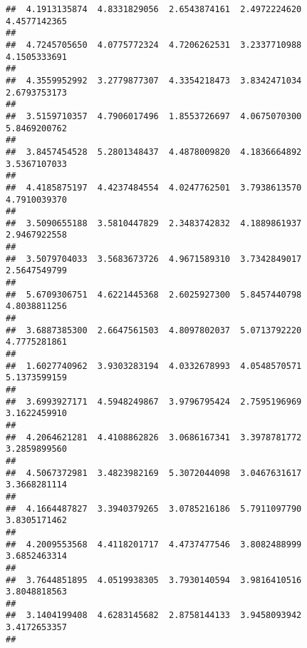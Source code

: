 \documentclass[]{article}
\begin{document}
\begin{verbatim}
##  4.1913135874  4.8331829056  2.6543874161  2.4972224620  4.4577142365 
##                                                                       
##  4.7245705650  4.0775772324  4.7206262531  3.2337710988  4.1505333691 
##                                                                       
##  4.3559952992  3.2779877307  4.3354218473  3.8342471034  2.6793753173 
##                                                                       
##  3.5159710357  4.7906017496  1.8553726697  4.0675070300  5.8469200762 
##                                                                       
##  3.8457454528  5.2801348437  4.4878009820  4.1836664892  3.5367107033 
##                                                                       
##  4.4185875197  4.4237484554  4.0247762501  3.7938613570  4.7910039370 
##                                                                       
##  3.5090655188  3.5810447829  2.3483742832  4.1889861937  2.9467922558 
##                                                                       
##  3.5079704033  3.5683673726  4.9671589310  3.7342849017  2.5647549799 
##                                                                       
##  5.6709306751  4.6221445368  2.6025927300  5.8457440798  4.8038811256 
##                                                                       
##  3.6887385300  2.6647561503  4.8097802037  5.0713792220  4.7775281861 
##                                                                       
##  1.6027740962  3.9303283194  4.0332678993  4.0548570571  5.1373599159 
##                                                                       
##  3.6993927171  4.5948249867  3.9796795424  2.7595196969  3.1622459910 
##                                                                       
##  4.2064621281  4.4108862826  3.0686167341  3.3978781772  3.2859899560 
##                                                                       
##  4.5067372981  3.4823982169  5.3072044098  3.0467631617  3.3668281114 
##                                                                       
##  4.1664487827  3.3940379265  3.0785216186  5.7911097790  3.8305171462 
##                                                                       
##  4.2009553568  4.4118201717  4.4737477546  3.8082488999  3.6852463314 
##                                                                       
##  3.7644851895  4.0519938305  3.7930140594  3.9816410516  3.8048818563 
##                                                                       
##  3.1404199408  4.6283145682  2.8758144133  3.9458093942  3.4172653357 
##                                                                       

\end{verbatim}
\end{document}
